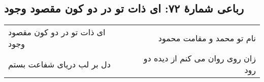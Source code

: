 \begin{center}
\section*{رباعی شمارهٔ ۷۲: ای ذات تو در دو کون مقصود وجود}
\label{sec:072}
\begin{longtable}{l p{0.5cm} r}
ای ذات تو در دو کون مقصود وجود
&&
نام تو محمد و مقامت محمود
\\
دل بر لب دریای شفاعت بستم
&&
زان روی روان می کنم از دیده دو رود
\\
\end{longtable}
\end{center}
